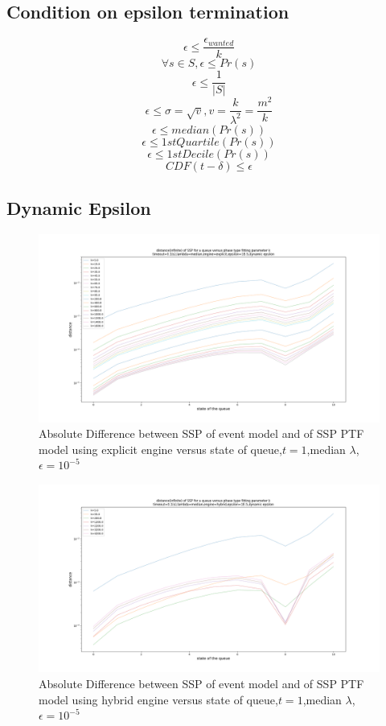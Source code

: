 \documentclass[paper=a4, fontsize=11pt]{scrartcl}
\numberwithin{equation}{section}		%
\numberwithin{figure}{section}			%
\numberwithin{table}{section}				%
\begin{document}
\clearpage
\subsection[epsilon termination]{Condition on epsilon termination}
$$\epsilon \leq \frac{\epsilon_{wanted}}{k}$$
$$\forall s \in S, \epsilon \leq Pr(s)$$
$$\epsilon \leq \frac{1}{|S|}$$
$$\epsilon \leq \sigma = \sqrt{v}, v = \frac{k}{\lambda^2} = \frac{m^2}{k}$$
$$\epsilon \leq median(Pr(s))$$
$$\epsilon \leq 1stQuartile(Pr(s))$$
$$\epsilon \leq 1stDecile(Pr(s))$$
$$CDF(t-\delta) \leq \epsilon$$

\clearpage
\subsection[epsilon termination]{Dynamic Epsilon}


\begin{figure}
	\centering
	\includegraphics[width=17cm]{picture/New_model/distance_explicit_dynamic.png}
	\caption{Absolute Difference between SSP of event model and of SSP PTF model using explicit engine versus state of queue,$t=1$,median $\lambda$,$\epsilon=10^{-5}$}
	\label{fig:dist_dynamic_explicit}
\end{figure}	

\begin{figure}
	\centering
	\includegraphics[width=17cm]{picture/New_model/distance_hybrid_dynamic.png}
	\caption{Absolute Difference between SSP of event model and of SSP PTF model using hybrid engine versus state of queue,$t=1$,median $\lambda$,$\epsilon=10^{-5}$}
	\label{fig:dist_dynamic_hybrid}
\end{figure}
\end{document}
